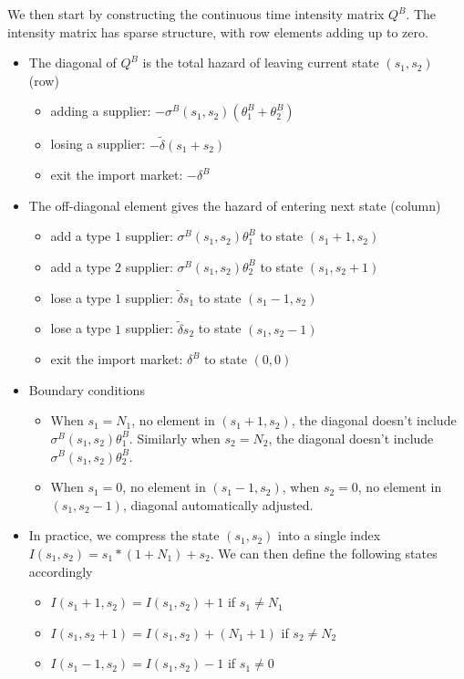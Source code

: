 \documentclass[12pt]{article} \usepackage{amsmath,amssymb,amsthm,geometry,graphicx,setspace,algorithm,algpseudocode,float}
\begin{document}
We then start by constructing the continuous time intensity matrix $Q^B$. The intensity matrix has sparse structure, with row elements adding up to zero. 
\begin{itemize}
\item The diagonal of $Q^B$ is the total hazard of leaving current state $(s_1,s_2)$ (row)
\begin{itemize}
\item adding a supplier: $-\sigma^B(s_1,s_2)(\theta_1^B+\theta_2^B)$
\item losing a supplier: $-\tilde{\delta}(s_1+s_2)$
\item exit the import market: $-\delta^B$
\end{itemize}
\item The off-diagonal element gives the hazard of entering next state (column)
\begin{itemize}
\item add a type $1$ supplier: $\sigma^B(s_1,s_2)\theta_1^B$ to state $(s_1+1,s_2)$  
\item add a type $2$ supplier: $\sigma^B(s_1,s_2)\theta_2^B$ to state $(s_1,s_2+1)$ 
\item lose a type $1$ supplier: $\tilde{\delta}s_1$ to state $(s_1-1,s_2)$ 
\item lose a type $1$ supplier: $\tilde{\delta}s_2$ to state $(s_1,s_2-1)$
\item exit the import market: $\delta^B$ to state $(0,0)$
\end{itemize}
\item Boundary conditions 
\begin{itemize}
\item When $s_1= N_1$, no element in $(s_1+1, s_2)$, the diagonal doesn't include $\sigma^B(s_1,s_2)\theta_1^B$. Similarly when $s_2= N_2$, the diagonal doesn't include $\sigma^B(s_1,s_2)\theta_2^B$. 
\item When $s_1 = 0$, no element in $(s_1-1, s_2)$, when $s_2= 0$, no element in $(s_1,s_2-1)$, diagonal automatically adjusted.
\end{itemize}
\item In practice, we compress the state $(s_1,s_2)$ into a single index $I(s_1,s_2) = s_1*(1+N_1)+s_2$. We can then define the following states accordingly
\begin{itemize}
\item $I(s_1+1, s_2)=I(s_1,s_2)+1$ if $s_1\neq N_1$
\item $I(s_1, s_2+1)=I(s_1,s_2)+(N_1+1)$ if $s_2\neq N_2$
\item $I(s_1-1, s_2)=I(s_1,s_2)-1$ if $s_1\neq 0$

\end{itemize}
\end{itemize}
\end{document}
